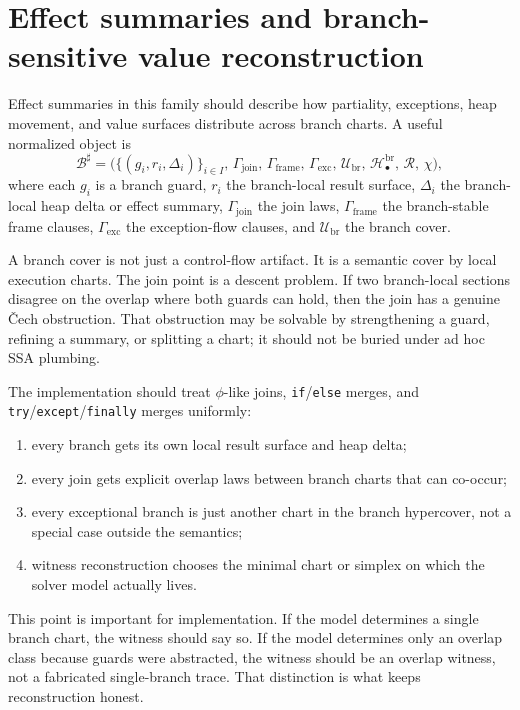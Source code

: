 \documentclass[11pt]{report}
\begin{document}
\section{Effect summaries and branch-sensitive value reconstruction}
Effect summaries in this family should describe how partiality, exceptions, heap movement, and value surfaces distribute across branch charts. A useful normalized object is
\[
\mathcal{B}^{\sharp}
=
\bigl(
\{(g_i,r_i,\Delta_i)\}_{i\in I},\,
\Gamma_{\mathrm{join}},\,
\Gamma_{\mathrm{frame}},\,
\Gamma_{\mathrm{exc}},\,
\mathcal{U}_{\mathrm{br}},\,
\mathcal{H}^{\mathrm{br}}_{\bullet},\,
\mathcal{R},\,
\chi
\bigr),
\]
where each $g_i$ is a branch guard, $r_i$ the branch-local result surface, $\Delta_i$ the branch-local heap delta or effect summary, $\Gamma_{\mathrm{join}}$ the join laws, $\Gamma_{\mathrm{frame}}$ the branch-stable frame clauses, $\Gamma_{\mathrm{exc}}$ the exception-flow clauses, and $\mathcal{U}_{\mathrm{br}}$ the branch cover.

A branch cover is not just a control-flow artifact. It is a semantic cover by local execution charts. The join point is a descent problem. If two branch-local sections disagree on the overlap where both guards can hold, then the join has a genuine \v{C}ech obstruction. That obstruction may be solvable by strengthening a guard, refining a summary, or splitting a chart; it should not be buried under ad hoc SSA plumbing.

The implementation should treat $\phi$-like joins, \texttt{if}/\texttt{else} merges, and \texttt{try}/\texttt{except}/\texttt{finally} merges uniformly:
\begin{enumerate}
\item every branch gets its own local result surface and heap delta;
\item every join gets explicit overlap laws between branch charts that can co-occur;
\item every exceptional branch is just another chart in the branch hypercover, not a special case outside the semantics;
\item witness reconstruction chooses the minimal chart or simplex on which the solver model actually lives.
\end{enumerate}

This point is important for implementation. If the model determines a single branch chart, the witness should say so. If the model determines only an overlap class because guards were abstracted, the witness should be an overlap witness, not a fabricated single-branch trace. That distinction is what keeps reconstruction honest.
\end{document}

